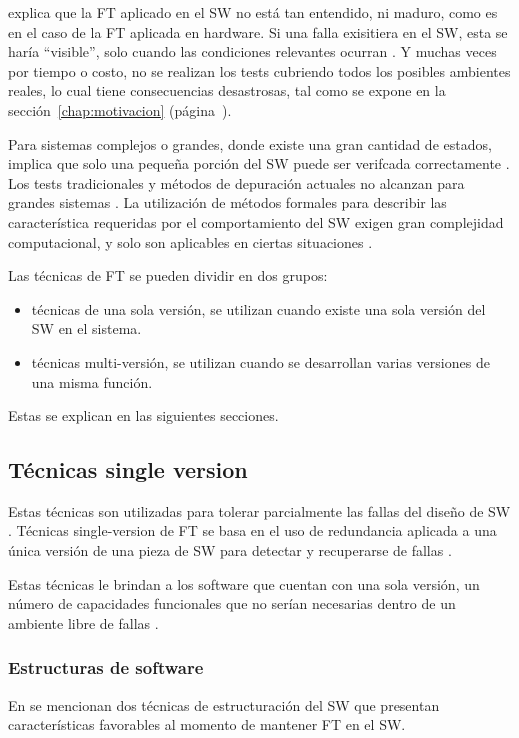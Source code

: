 \cite{FTDesign} explica que la \ac{FT} aplicado en el \ac{SW} no está tan entendido, ni maduro, 
como es en el caso de la \ac{FT} aplicada en hardware. Si una falla exisitiera en el \ac{SW}, esta 
se haría ``visible'', solo cuando las condiciones relevantes ocurran \citep{FTDesign}. Y muchas 
veces por tiempo o costo, no se realizan los tests cubriendo todos los posibles ambientes reales, 
lo cual tiene consecuencias desastrosas, tal como se expone en la sección~\ref{chap:motivacion} 
(página~\pageref{chap:motivacion}).

Para sistemas complejos o grandes, donde existe una gran cantidad de estados, implica que solo una 
pequeña porción del \ac{SW} puede ser verifcada correctamente \citep{FTDesign}. Los tests 
tradicionales y métodos de depuración actuales no alcanzan para grandes sistemas \citep{FTDesign}. 
La utilización de métodos formales para describir las característica requeridas por el 
comportamiento del \ac{SW} exigen gran complejidad computacional, y solo son aplicables en 
ciertas situaciones \citep{FTDesign}.

Las técnicas de \ac{FT} se pueden dividir en dos grupos:
\begin{itemize}
 \item técnicas de una sola versión, se utilizan cuando existe una sola versión del \ac{SW} en el 
sistema.
 \item técnicas multi-versión, se utilizan cuando se desarrollan varias versiones de una misma 
función. 
\end{itemize}

Estas se explican en las siguientes secciones.

\subsection{Técnicas single version}
Estas técnicas son utilizadas para tolerar parcialmente las fallas del diseño de \ac{SW} 
\citep{Pullum01}. Técnicas single-version de \ac{FT} se basa en el uso de redundancia aplicada a 
una única versión de una pieza de \ac{SW} para detectar y recuperarse de fallas 
\citep{SoftwareFaultToleranceATutorial}. 

Estas técnicas le brindan a los software que cuentan con una sola versión, un número de capacidades funcionales 
que no serían necesarias dentro de un ambiente libre de fallas \citep{FTDesign}. 

\subsubsection{Estructuras de software}
En \cite{SoftwareFaultToleranceATutorial} se mencionan dos técnicas de estructuración del \ac{SW}
que presentan características favorables al momento de mantener \ac{FT} en el \ac{SW}.

